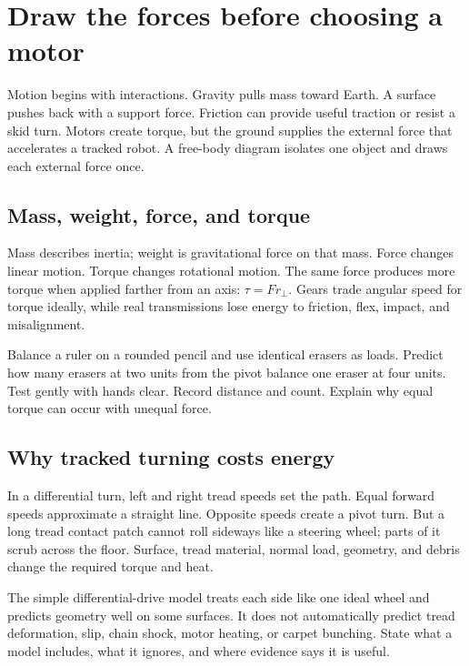 
\chapter{Draw the forces before choosing a motor}

Motion begins with interactions. Gravity pulls mass toward Earth. A surface pushes back with a support force. Friction can provide useful traction or resist a skid turn. Motors create torque, but the ground supplies the external force that accelerates a tracked robot. A free-body diagram isolates one object and draws each external force once.

\section*{Mass, weight, force, and torque}

Mass describes inertia; weight is gravitational force on that mass. Force changes linear motion. Torque changes rotational motion. The same force produces more torque when applied farther from an axis: \(\tau = F r_\perp\). Gears trade angular speed for torque ideally, while real transmissions lose energy to friction, flex, impact, and misalignment.

\begin{missionbox}[title={CARDBOARD LEVER LAB}]
Balance a ruler on a rounded pencil and use identical erasers as loads. Predict how many erasers at two units from the pivot balance one eraser at four units. Test gently with hands clear. Record distance and count. Explain why equal torque can occur with unequal force.
\end{missionbox}

\section*{Why tracked turning costs energy}

In a differential turn, left and right tread speeds set the path. Equal forward speeds approximate a straight line. Opposite speeds create a pivot turn. But a long tread contact patch cannot roll sideways like a steering wheel; parts of it scrub across the floor. Surface, tread material, normal load, geometry, and debris change the required torque and heat.

\begin{conceptbox}[title={A MODEL HAS A DOMAIN}]
The simple differential-drive model treats each side like one ideal wheel and predicts geometry well on some surfaces. It does not automatically predict tread deformation, slip, chain shock, motor heating, or carpet bunching. State what a model includes, what it ignores, and where evidence says it is useful.
\end{conceptbox}

